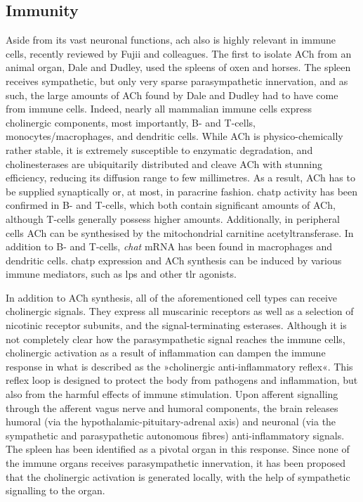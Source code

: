 \subsection{Immunity} \label{sec:intro:immunity}
Aside from its vast neuronal functions, \ac{ach} also is highly relevant in immune cells, recently reviewed by Fujii and colleagues.\cite{Fujii2017} The first to isolate ACh from an animal organ, Dale and Dudley,\cite{Dale1929} used the spleens of oxen and horses. The spleen receives sympathetic, but only very sparse parasympathetic innervation, and as such, the large amounts of ACh found by Dale and Dudley had to have come from immune cells. Indeed, nearly all mammalian immune cells express cholinergic components, most importantly, B- and T-cells, monocytes/macrophages, and dendritic cells. While ACh is physico-chemically rather stable, it is extremely susceptible to enzymatic degradation, and cholinesterases are ubiquitarily distributed and cleave ACh with stunning efficiency, reducing its diffusion range to few millimetres. As a result, ACh has to be supplied synaptically or, at most, in paracrine fashion. \Ac{chatp} activity has been confirmed in B- and T-cells, which both contain significant amounts of ACh, although T-cells generally possess higher amounts. Additionally, in peripheral cells ACh can be synthesised by the mitochondrial carnitine acetyltransferase. In addition to B- and T-cells, \emph{\acs{chat}} mRNA has been found in macrophages and dendritic cells. \ac{chatp} expression and ACh synthesis can be induced by various immune mediators, such as \ac{lps} and other \ac{tlr} agonists.

In addition to ACh synthesis, all of the aforementioned cell types can receive cholinergic signals. They express all muscarinic receptors as well as a selection of nicotinic receptor subunits, and the signal-terminating esterases. Although it is not completely clear how the parasympathetic signal reaches the immune cells, cholinergic activation as a result of inflammation can dampen the immune response in what is described as the »cholinergic anti-inflammatory reflex«.\cite{Pavlov2017} This reflex loop is designed to protect the body from pathogens and inflammation, but also from the harmful effects of immune stimulation. Upon afferent signalling through the afferent vagus nerve and humoral components, the brain releases humoral (via the hypothalamic-pituitary-adrenal axis) and neuronal (via the sympathetic and parasypathetic autonomous fibres) anti-inflammatory signals. The spleen has been identified as a pivotal organ in this response. Since none of the immune organs receives parasympathetic innervation, it has been proposed that the cholinergic activation is generated locally, with the help of sympathetic signalling to the organ.\cite{Dantzer2018}

